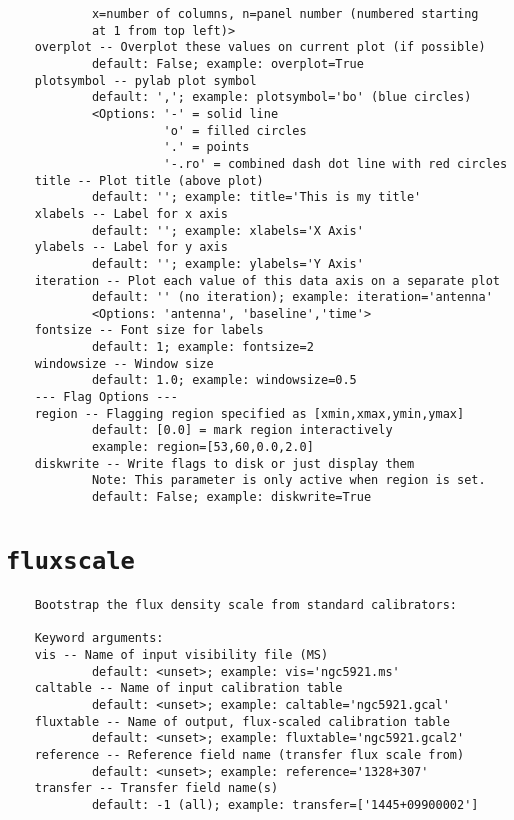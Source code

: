 \begin{verbatim}
            x=number of columns, n=panel number (numbered starting
            at 1 from top left)>
    overplot -- Overplot these values on current plot (if possible)
            default: False; example: overplot=True
    plotsymbol -- pylab plot symbol
            default: ','; example: plotsymbol='bo' (blue circles)
            <Options: '-' = solid line
                      'o' = filled circles
                      '.' = points
                      '-.ro' = combined dash dot line with red circles
    title -- Plot title (above plot)
            default: ''; example: title='This is my title'
    xlabels -- Label for x axis
            default: ''; example: xlabels='X Axis'
    ylabels -- Label for y axis
            default: ''; example: ylabels='Y Axis'
    iteration -- Plot each value of this data axis on a separate plot
            default: '' (no iteration); example: iteration='antenna'
            <Options: 'antenna', 'baseline','time'>
    fontsize -- Font size for labels
            default: 1; example: fontsize=2
    windowsize -- Window size
            default: 1.0; example: windowsize=0.5
    --- Flag Options ---
    region -- Flagging region specified as [xmin,xmax,ymin,ymax]
            default: [0.0] = mark region interactively
            example: region=[53,60,0.0,2.0]
    diskwrite -- Write flags to disk or just display them
            Note: This parameter is only active when region is set.
            default: False; example: diskwrite=True
\end{verbatim}
\normalsize


\section{{\tt fluxscale}}
\label{section:tasks.fluxscale}

\small
\begin{verbatim}
    Bootstrap the flux density scale from standard calibrators:
    
    Keyword arguments:
    vis -- Name of input visibility file (MS)
            default: <unset>; example: vis='ngc5921.ms'
    caltable -- Name of input calibration table
            default: <unset>; example: caltable='ngc5921.gcal'
    fluxtable -- Name of output, flux-scaled calibration table
            default: <unset>; example: fluxtable='ngc5921.gcal2'
    reference -- Reference field name (transfer flux scale from)
            default: <unset>; example: reference='1328+307'
    transfer -- Transfer field name(s)
            default: -1 (all); example: transfer=['1445+09900002']
\end{verbatim}
\normalsize


